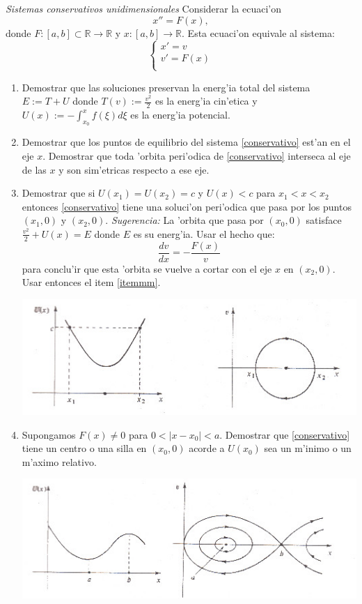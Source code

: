 \begin{ejercicio}\emph{ Sistemas  conservativos unidimensionales}
Considerar la ecuaci'on
\[
    x''=F(x),
\]
donde $F:[a,b]\subset\mathbb{R}\to\mathbb{R}$ y
$x:[a,b]\to\mathbb{R}$. Esta ecuaci'on equivale al sistema:
\begin{equation}\label{conservativo}
    \left\{%
\begin{array}{ll}
    x'=v \\
    v'=F(x) \\
\end{array}%
\right.
\end{equation}

\begin{enumerate}
\item Demostrar que las soluciones preservan la energ'ia total del sistema
$E:=T+U$ donde $T(v):=\frac{v^2}{2}$ es la energ'ia cin'etica y
$U(x):=-\int_{x_0}^x  f(\xi)d\xi$ es la energ'ia potencial.
\item\label{itemmm} Demostrar que los puntos de equilibrio del sistema
\eqref{conservativo} est'an en el eje $x$. Demostrar que toda
'orbita peri'odica de \eqref{conservativo} interseca al eje de las
$x$ y son sim'etricas respecto a ese eje.
\item Demostrar que si $U(x_1)=U(x_2)=c$ y $U(x)<c$ para
$x_1<x<x_2$ entonces \eqref{conservativo} tiene una soluci'on
peri'odica que pasa por los puntos $(x_1,0)$ y $(x_2,0)$.
\emph{Sugerencia:} La 'orbita que pasa por $(x_0,0)$  satisface
$\frac{v^2}{2}+U(x)=E$ donde $E$ es su energ'ia. Usar el hecho
que:
\[
    \frac{dv}{dx}=-\frac{F(x)}{v}
\]
para conclu'ir que esta 'orbita se vuelve a cortar con el eje $x$
en $(x_2,0)$. Usar entonces el item \ref{itemmm}.

\includegraphics{imagenes/dibu4.jpg}

\item Supongamos $F(x)\neq 0$ para $0<|x-x_0|<a$. Demostrar que
\eqref{conservativo} tiene un centro o una silla en $(x_0,0)$
acorde a $U(x_0)$ sea un m'inimo o un m'aximo relativo.

\includegraphics{imagenes/dibu5.jpg}
\end{enumerate}


\end{ejercicio}

